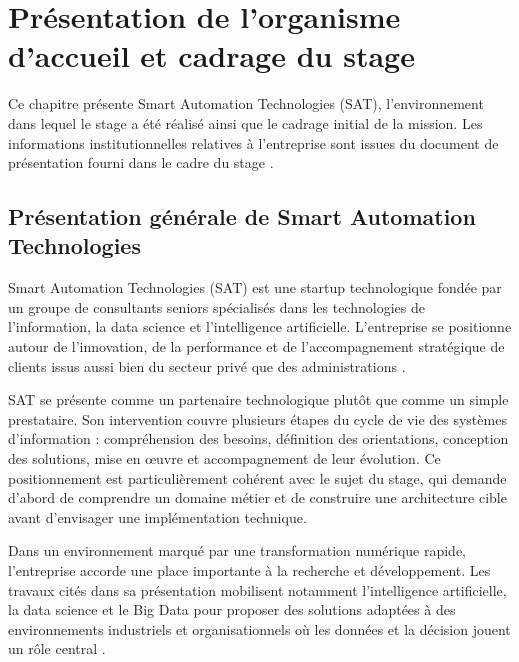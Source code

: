 \chapter{Présentation de l’organisme d’accueil et cadrage du stage}

\label{chap:1}

Ce chapitre présente Smart Automation Technologies (SAT), l’environnement dans lequel le stage a été réalisé ainsi que le cadrage initial de la mission. Les informations institutionnelles relatives à l’entreprise sont issues du document de présentation fourni dans le cadre du stage \cite{ref1}.



\section{Présentation générale de Smart Automation Technologies}

\label{sec:1.1}

Smart Automation Technologies (SAT) est une startup technologique fondée par un groupe de consultants seniors spécialisés dans les technologies de l’information, la data science et l’intelligence artificielle. L’entreprise se positionne autour de l’innovation, de la performance et de l’accompagnement stratégique de clients issus aussi bien du secteur privé que des administrations \cite{ref1}.


SAT se présente comme un partenaire technologique plutôt que comme un simple prestataire. Son intervention couvre plusieurs étapes du cycle de vie des systèmes d’information : compréhension des besoins, définition des orientations, conception des solutions, mise en œuvre et accompagnement de leur évolution. Ce positionnement est particulièrement cohérent avec le sujet du stage, qui demande d’abord de comprendre un domaine métier et de construire une architecture cible avant d’envisager une implémentation technique.


Dans un environnement marqué par une transformation numérique rapide, l’entreprise accorde une place importante à la recherche et développement. Les travaux cités dans sa présentation mobilisent notamment l’intelligence artificielle, la data science et le Big Data pour proposer des solutions adaptées à des environnements industriels et organisationnels où les données et la décision jouent un rôle central \cite{ref1}.



